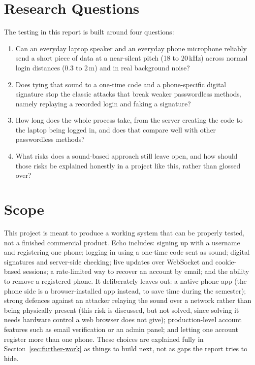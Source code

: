\section{Research Questions}

The testing in this report is built around four questions:

\begin{enumerate}[label=RQ\arabic*.]
  \item Can an everyday laptop speaker and an everyday phone microphone
  reliably send a short piece of data at a near-silent pitch (18 to 20\,kHz)
  across normal login distances (0.3 to 2\,m) and in real background noise?
  \item Does tying that sound to a one-time code and a phone-specific
  digital signature stop the classic attacks that break weaker
  passwordless methods, namely replaying a recorded login and faking a
  signature?
  \item How long does the whole process take, from the server creating the
  code to the laptop being logged in, and does that compare well with
  other passwordless methods?
  \item What risks does a sound-based approach still leave open, and how
  should those risks be explained honestly in a project like this, rather
  than glossed over?
\end{enumerate}

\section{Scope}

This project is meant to produce a working system that can be properly
tested, not a finished commercial product. Echo includes: signing up with
a username and registering one phone; logging in using a one-time code
sent as sound; digital signatures and server-side checking; live updates
over WebSocket and cookie-based sessions; a rate-limited way to recover an
account by email; and the ability to remove a registered phone. It
deliberately leaves out: a native phone app (the phone side is a
browser-installed app instead, to save time during the semester); strong
defences against an attacker relaying the sound over a network rather than
being physically present (this risk is discussed, but not solved, since
solving it needs hardware control a web browser does not give);
production-level account features such as email verification or an admin
panel; and letting one account register more than one phone. These
choices are explained fully in Section~\ref{sec:further-work} as things to
build next, not as gaps the report tries to hide.

